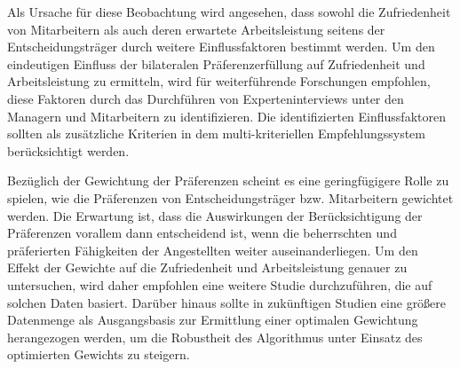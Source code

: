 Als Ursache für diese Beobachtung wird angesehen, dass sowohl die Zufriedenheit von Mitarbeitern als auch deren erwartete Arbeitsleistung seitens der Entscheidungsträger durch weitere Einflussfaktoren bestimmt werden.
Um den eindeutigen Einfluss der bilateralen Präferenzerfüllung auf Zufriedenheit und Arbeitsleistung zu ermitteln, wird für weiterführende Forschungen empfohlen, diese Faktoren durch das Durchführen von Experteninterviews unter den Managern und Mitarbeitern zu identifizieren.
Die identifizierten Einflussfaktoren sollten als zusätzliche Kriterien in dem multi-kriteriellen Empfehlungssystem berücksichtigt werden.

Bezüglich der Gewichtung der Präferenzen scheint es eine geringfügigere Rolle zu spielen, wie die Präferenzen von Entscheidungsträger bzw. Mitarbeitern gewichtet werden.
Die Erwartung ist, dass die Auswirkungen der Berücksichtigung der Präferenzen vorallem dann entscheidend ist, wenn die beherrschten und präferierten Fähigkeiten der Angestellten weiter auseinanderliegen.
Um den Effekt der Gewichte auf die Zufriedenheit und Arbeitsleistung genauer zu untersuchen, wird daher empfohlen eine weitere Studie durchzuführen, die auf solchen Daten basiert.
Darüber hinaus sollte in zukünftigen Studien eine größere Datenmenge als Ausgangsbasis zur Ermittlung einer optimalen Gewichtung herangezogen werden, um die Robustheit des Algorithmus unter Einsatz des optimierten Gewichts zu steigern.



